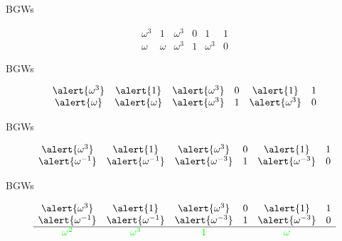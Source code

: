 \documentclass{beamer}
\newcommand{\ggreen}[1]{\textcolor{green}{#1}}
\begin{document}
 
 \begin{frame}{BGWs}
  
  \[
   \begin{array}{cccccc}
  \omega^3&1&\omega^3&0&1&1\\
  \omega&\omega&\omega^3&1&\omega^3&0
   \end{array}
  \]

 \end{frame}

 
 \begin{frame}{BGWs}
  
  \[
   \begin{array}{cccccc}
  \alert{\omega^3}&\alert{1}&\alert{\omega^3}&0&\alert{1}&1\\
  \alert{\omega}&\alert{\omega}&\alert{\omega^3}&1&\alert{\omega^3}&0
   \end{array}
  \]

 \end{frame}
 
 
 \begin{frame}{BGWs}
  
  \[
   \begin{array}{cccccc}
  \alert{\omega^3}&\alert{1}&\alert{\omega^3}&0&\alert{1}&1\\
  \alert{\omega^{-1}}&\alert{\omega^{-1}}&\alert{\omega^{-3}}&1&\alert{\omega^{-3}}&0
   \end{array}
  \]

 \end{frame}
 
 
 \begin{frame}{BGWs}
  
  \[
   \begin{array}{cccccc}
  \alert{\omega^3}&\alert{1}&\alert{\omega^3}&0&\alert{1}&1\\
  \alert{\omega^{-1}}&\alert{\omega^{-1}}&\alert{\omega^{-3}}&1&\alert{\omega^{-3}}&0 \\ \hline
  \ggreen{\omega^2}&\ggreen{\omega^3}&\ggreen{1}&&\ggreen{\omega}&
   \end{array}
  \]

 \end{frame}
 
\end{document}
